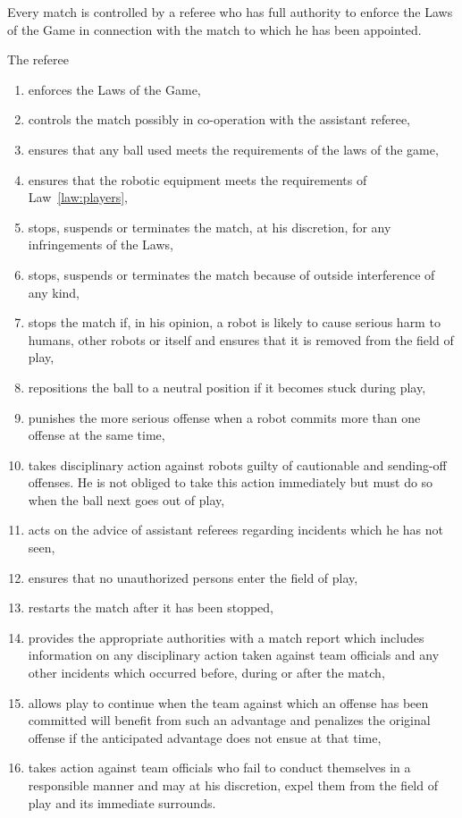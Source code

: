 \documentclass[12pt]{hurocup}
\begin{document}
\begin{lawlist}[G]

\item Every match is controlled by a referee who has full authority to
  enforce the Laws of the Game in connection with the match to which
  he has been appointed.

\item The referee
  \begin{enumerate}
    \item enforces the Laws of the Game,
    \item controls the match possibly in co-operation with the
      assistant referee,
    \item ensures that any ball used meets the requirements of
      the laws of the game,
    \item ensures that the robotic equipment meets the requirements of
      Law~\ref{law:players},
    \item stops, suspends or terminates the match, at his discretion,
      for any infringements of the Laws,
    \item stops, suspends or terminates the match because of outside
      interference of any kind,
    \item stops the match if, in his opinion, a robot is likely to
      cause serious harm to humans, other robots or itself and ensures
      that it is removed from the field of play,
    \item repositions the ball to a neutral position if it becomes
      stuck during play,
    \item punishes the more serious offense when a robot commits more
      than one offense at the same time,
    \item takes disciplinary action against robots guilty of
      cautionable and sending-off offenses. He is not obliged to take
      this action immediately but must do so when the ball next goes
      out of play,
    \item acts on the advice of assistant referees regarding incidents
      which he has not seen,
    \item ensures that no unauthorized persons enter the field of play,
    \item restarts the match after it has been stopped,
    \item provides the appropriate authorities with a match report
      which includes information on any disciplinary action taken
      against team officials and any other incidents which occurred
      before, during or after the match,
    \item allows play to continue when the team against which an
      offense has been committed will benefit from such an advantage
      and penalizes the original offense if the anticipated advantage
      does not ensue at that time,
    \item takes action against team officials who fail to conduct
      themselves in a responsible manner and may at his discretion,
      expel them from the field of play and its immediate surrounds.
  \end{enumerate}


\end{lawlist}
\end{document}
